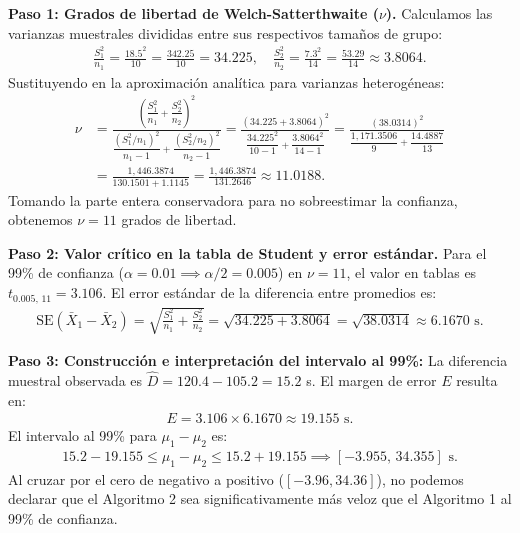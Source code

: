 \begin{solproblema}
	\textbf{Paso 1: Grados de libertad de Welch-Satterthwaite ($\nu$).}
	Calculamos las varianzas muestrales divididas entre sus respectivos tamaños de grupo:
	\begin{align}
		\frac{S_1^2}{n_1} = \frac{18.5^2}{10} = \frac{342.25}{10} = 34.225, \quad \frac{S_2^2}{n_2} = \frac{7.3^2}{14} = \frac{53.29}{14} \approx 3.8064.
	\end{align}
	Sustituyendo en la aproximación analítica para varianzas heterogéneas:
	\begin{align}
		\nu &= \frac{\left( \dfrac{S_1^2}{n_1} + \dfrac{S_2^2}{n_2} \right)^2}{\dfrac{(S_1^2 / n_1)^2}{n_1 - 1} + \dfrac{(S_2^2 / n_2)^2}{n_2 - 1}} = \frac{(34.225 + 3.8064)^2}{\dfrac{34.225^2}{10 - 1} + \dfrac{3.8064^2}{14 - 1}} = \frac{(38.0314)^2}{\dfrac{1,171.3506}{9} + \dfrac{14.4887}{13}} \\
		&= \frac{1,446.3874}{130.1501 + 1.1145} = \frac{1,446.3874}{131.2646} \approx 11.0188.
	\end{align}
	Tomando la parte entera conservadora para no sobreestimar la confianza, obtenemos $\nu = 11$ grados de libertad.
	
	\textbf{Paso 2: Valor crítico en la tabla de Student y error estándar.}
	Para el 99\% de confianza ($\alpha = 0.01 \implies \alpha/2 = 0.005$) en $\nu = 11$, el valor en tablas es $t_{0.005, \, 11} = 3.106$.
	El error estándar de la diferencia entre promedios es:
	\begin{align}
		\text{SE}(\bar{X}_1 - \bar{X}_2) = \sqrt{\frac{S_1^2}{n_1} + \frac{S_2^2}{n_2}} = \sqrt{34.225 + 3.8064} = \sqrt{38.0314} \approx 6.1670 \text{ s.}
	\end{align}
	
	\textbf{Paso 3: Construcción e interpretación del intervalo al 99\%:}
	La diferencia muestral observada es $\hat{D} = 120.4 - 105.2 = 15.2$ s. El margen de error $E$ resulta en:
	\begin{align}
		E = 3.106 \times 6.1670 \approx 19.155 \text{ s.}
	\end{align}
	El intervalo al 99\% para $\mu_1 - \mu_2$ es:
	\begin{align}
		15.2 - 19.155 \le \mu_1 - \mu_2 \le 15.2 + 19.155 \implies [-3.955, \, 34.355] \text{ s.}
	\end{align}
	Al cruzar por el cero de negativo a positivo ($[-3.96, 34.36]$), no podemos declarar que el Algoritmo 2 sea significativamente más veloz que el Algoritmo 1 al 99\% de confianza.
\end{solproblema}

